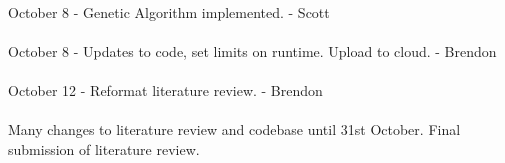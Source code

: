 \documentclass{report}%
\begin{document}
\paragraph*{}October 8 - Genetic Algorithm implemented. - Scott

\paragraph*{}October 8 - Updates to code, set limits on runtime. Upload to cloud. - Brendon

\paragraph*{}October 12 - Reformat literature review. - Brendon

\paragraph*{}Many changes to literature review and codebase until 31st October. Final submission of literature review.
\end{document}
